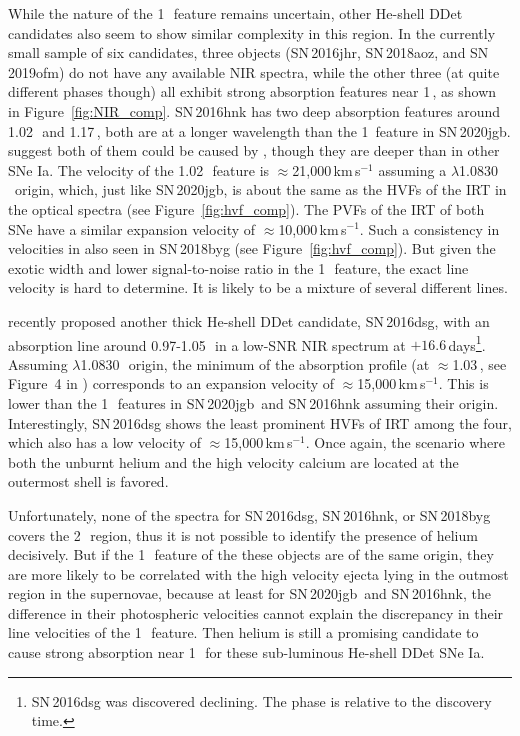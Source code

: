 \documentclass[twocolumn]{aastex631}
\newcommand{\sn}{SN\,2020jgb}
\begin{document}
While the nature of the 1\,\micron\ feature remains uncertain, other He-shell DDet candidates also seem to show similar complexity in this region. In the currently small sample of six candidates, three objects (SN\,2016jhr, SN\,2018aoz, and SN\,2019ofm) do not have any available NIR spectra, while the other three (at quite different phases though) all exhibit strong absorption features near 1\,\micron, as shown in Figure~\ref{fig:NIR_comp}. SN\,2016hnk has two deep absorption features around 1.02\,\micron\ and 1.17\,\micron, both are at a longer wavelength than the 1\micron\ feature in \sn. \citet{galbany_16hnk_2019} suggest both of them could be caused by , though they are deeper than in other SNe Ia. The velocity of the 1.02\,\micron\ feature is $\approx$21,000\,km\,s$^{-1}$ assuming a  $\lambda$1.0830\,\micron\ origin, which, just like \sn, is about the same as the HVFs of the  IRT in the optical spectra (see Figure~\ref{fig:hvf_comp}). The PVFs of the  IRT of both SNe have a similar expansion velocity of $\approx$10,000\,km\,s$^{-1}$. Such a consistency in velocities in also seen in SN\,2018byg (see Figure~\ref{fig:hvf_comp}). But given the exotic width and lower signal-to-noise ratio in the 1\,\micron\ feature, the exact line velocity is hard to determine. It is likely to be a mixture of several different lines. 

\citet{Dong_16dsg_2022} recently proposed another thick He-shell DDet candidate, SN\,2016dsg, with an absorption line around 0.97-1.05\,\micron\ in a low-SNR NIR spectrum at $+16.6$\,days\footnote{SN\,2016dsg was discovered declining. The phase is relative to the discovery time.}. Assuming  $\lambda$1.0830\,\micron\ origin, the minimum of the absorption profile (at $\approx$1.03\,\micron, see Figure~4 in \citealp{Dong_16dsg_2022}) corresponds to an expansion velocity of $\approx$15,000\,km\,s$^{-1}$. This is lower than the 1\,\micron\ features in \sn\ and SN\,2016hnk assuming their  origin. Interestingly, SN\,2016dsg shows the least prominent HVFs of  IRT among the four, which also has a low velocity of $\approx$15,000\,km\,s$^{-1}$. Once again, the scenario where both the unburnt helium and the high velocity calcium are located at the outermost shell is favored.

Unfortunately, none of the spectra for SN\,2016dsg, SN\,2016hnk, or SN\,2018byg covers the 2\,\micron\ region, thus it is not possible to identify the presence of helium decisively. But if the 1\,\micron\ feature of the these objects are of the same origin, they are more likely to be correlated with the high velocity ejecta lying in the outmost region in the supernovae, because at least for \sn\ and SN\,2016hnk, the difference in their photospheric velocities cannot explain the discrepancy in their line velocities of the 1\,\micron\ feature. Then helium is still a promising candidate to cause strong absorption near 1\,\micron\ for these sub-luminous He-shell DDet SNe Ia. 
\end{document}
